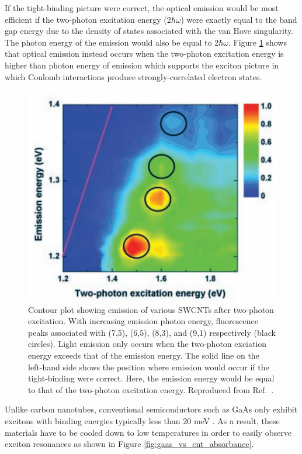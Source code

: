 If the tight-binding picture were correct, the optical emission would be most efficient if the two-photon excitation energy (2$\hbar \omega$) were exactly equal to the band gap energy due to the density of states associated with the van Hove singularity. The photon energy of the emission would also be equal to 2$\hbar \omega$. Figure \ref{fig:cnt_two_photon_emission} shows that optical emission instead occurs when the two-photon excitation energy is higher than photon energy of emission which supports the exciton picture in which Coulomb interactions produce strongly-correlated electron states.



\begin{figure}[H]
	\centering
	\includegraphics[scale=0.3]{images/chapter_optical_props/two_photon_wang}
	\caption{Contour plot showing emission of various SWCNTs after two-photon excitation. With increasing emission photon energy, fluorescence peaks associated with (7,5), (6,5), (8,3), and (9,1) respectively (black circles). Light emission only occurs when the two-photon exciation energy exceeds that of the emission energy. The solid line on the left-hand side shows the position where emission would occur if the tight-binding were correct. Here, the emission energy would be equal to that of the two-photon excitation energy. Reproduced from Ref.\ \cite{wang2005optical}.}
	\label{fig:cnt_two_photon_emission}
\end{figure}

Unlike carbon nanotubes, conventional semiconductors such as GaAs only exhibit excitons with binding energies typically less than 20 meV \cite{liang1970excitons}.  As a result, these materials have to be cooled down to low temperatures in order to easily observe exciton resonances as shown in Figure \ref{fig:gaas_vs_cnt_absorbance}.

